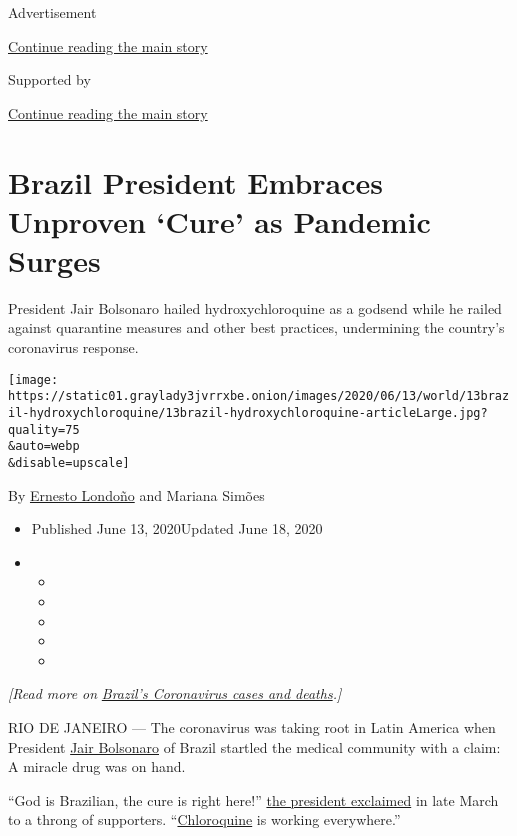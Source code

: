 Advertisement

\protect\hyperlink{after-top}{Continue reading the main story}

Supported by

\protect\hyperlink{after-sponsor}{Continue reading the main story}

\hypertarget{brazil-president-embraces-unproven-cure-as-pandemic-surges}{%
\section{Brazil President Embraces Unproven `Cure' as Pandemic
Surges}\label{brazil-president-embraces-unproven-cure-as-pandemic-surges}}

President Jair Bolsonaro hailed hydroxychloroquine as a godsend while he
railed against quarantine measures and other best practices, undermining
the country's coronavirus response.

\texttt{[image: https://static01.graylady3jvrrxbe.onion/images/2020/06/13/world/13brazil-hydroxychloroquine/13brazil-hydroxychloroquine-articleLarge.jpg?quality=75\\\&auto=webp\\\&disable=upscale]}

By \href{https://www.nytimes3xbfgragh.onion/by/ernesto-londono}{Ernesto
Londoño} and Mariana Simões

\begin{itemize}
\item
  Published June 13, 2020Updated June 18, 2020
\item
  \begin{itemize}
  \item
  \item
  \item
  \item
  \item
  \end{itemize}
\end{itemize}

\emph{{[}Read more on}
\href{https://www.nytimes3xbfgragh.onion/article/brazil-coronavirus-cases.html}{\emph{Brazil's
Coronavirus cases and deaths}}\emph{.{]}}

RIO DE JANEIRO --- The coronavirus was taking root in Latin America when
President
\href{https://www.nytimes3xbfgragh.onion/2020/07/07/world/americas/brazil-bolsonaro-coronavirus.html}{Jair
Bolsonaro} of Brazil startled the medical community with a claim: A
miracle drug was on hand.

``God is Brazilian, the cure is right here!''
\href{https://oglobo.globo.com/sociedade/coronavirus/deus-brasileiro-a-cura-ta-ai-diz-bolsonaro-sobre-remedio-ainda-em-teste-contra-covid-19-1-24337060}{the
president exclaimed} in late March to a throng of supporters.
``\href{https://www.nytimes3xbfgragh.onion/2020/06/15/health/fda-hydroxychloroquine-malaria.html}{Chloroquine}
is working everywhere.''

